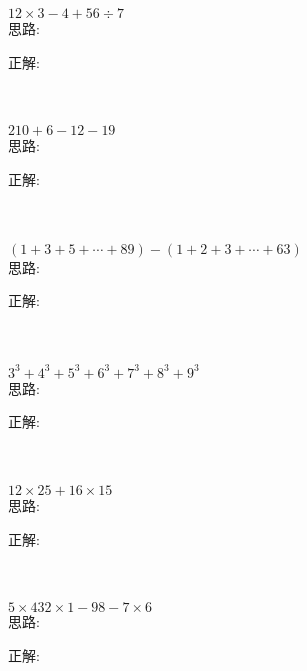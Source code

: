 \item {
    $12\times 3 - 4 + 56\div 7$
    \ifshowSolution
        \fangsong{}
        \\
        思路:

        正解: 
    \else
        \\ \\ \\
    \fi
}

\item {
    $210 + 6-12 - 19$
    \ifshowSolution
        \fangsong{}
        \\
        思路:

        正解: 
    \else
        \\ \\ \\
    \fi
}

\item {
    $(1+3+5+\cdots + 89) - (1+2+3+\cdots + 63)$  
    \ifshowSolution
        \fangsong{}
        \\
        思路:

        正解: 
    \else
        \\ \\ \\
    \fi
}

\item {
    $3^3 + 4^3 + 5^3 + 6^3 + 7^3 + 8^3 + 9^3$
    \ifshowSolution
        \fangsong{}
        \\
        思路:

        正解: 
    \else
        \\ \\ \\
    \fi
}

\item {
    $12\times 25 + 16\times 15$
    \ifshowSolution
        \fangsong{}
        \\
        思路:

        正解: 
    \else
        \\ \\ \\
    \fi
}

\item {
    $5\times 432\times 1 - 98 - 7\times 6$
    \ifshowSolution
        \fangsong{}
        \\
        思路:

        正解: 
    \else
        \\ \\ \\
    \fi
}

